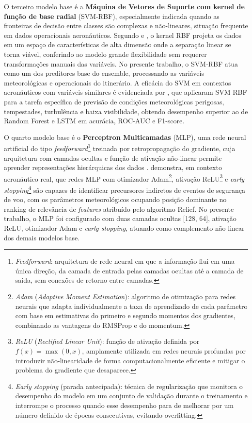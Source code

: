 \documentclass[english,brazilian]{UNISINOSartigo}
\begin{document}
O terceiro modelo base é a \textbf{Máquina de Vetores de Suporte com kernel de
função de base radial} (SVM-RBF), especialmente indicada quando as fronteiras de
decisão entre classes são complexas e não-lineares, situação frequente em dados
operacionais aeronáuticos. Segundo  e ,
o kernel RBF projeta os dados em um espaço de características de alta dimensão
onde a separação linear se torna viável, conferindo ao modelo grande flexibilidade
sem requerer transformações manuais das variáveis. No presente trabalho, o
SVM-RBF atua como um dos preditores base do ensemble, processando as variáveis
meteorológicas e operacionais do itinerário. A eficácia do SVM em contextos
aeronáuticos com variáveis similares é evidenciada por , que
aplicaram SVM-RBF para a tarefa específica de previsão de condições meteorológicas
perigosas, tempestades, turbulência e baixa visibilidade, obtendo desempenho
superior ao de Random Forest e LSTM em acurácia, ROC-AUC e F1-score.

O quarto modelo base é o \textbf{Perceptron Multicamadas} (MLP), uma rede neural
artificial do tipo \textit{feedforward}\footnote{\textit{Feedforward}:
arquitetura de rede neural em que a informação flui em uma única direção, da
camada de entrada pelas camadas ocultas até a camada de saída, sem conexões
de retorno entre camadas.} treinada por retropropagação do gradiente,
cuja arquitetura com camadas ocultas e função de ativação não-linear permite
aprender representações hierárquicas dos dados \cite{HASTIE2009,MITCHELL1997}.
 demonstra, em contexto aeronáutico real, que redes MLP
com otimizador Adam\footnote{\textit{Adam} (\textit{Adaptive Moment
Estimation}): algoritmo de otimização para redes neurais que adapta
individualmente a taxa de aprendizado de cada parâmetro com base em estimativas
do primeiro e segundo momentos dos gradientes, combinando as vantagens do
RMSProp e do momentum.}, ativação ReLU\footnote{\textit{ReLU}
(\textit{Rectified Linear Unit}): função de ativação definida por
$f(x) = \max(0, x)$, amplamente utilizada em redes neurais profundas por
introduzir não-linearidade de forma computacionalmente eficiente e mitigar o
problema do gradiente que desaparece.} e \textit{early stopping}\footnote{%
\textit{Early stopping} (parada antecipada): técnica de regularização que
monitora o desempenho do modelo em um conjunto de validação durante o
treinamento e interrompe o processo quando esse desempenho para de melhorar
por um número definido de épocas consecutivas, evitando overfitting.} são
capazes de
identificar precursores indiretos de eventos de segurança de voo, com os parâmetros
meteorológicos ocupando posição dominante no ranking de relevância de
\textit{features} atribuído pelo algoritmo Relief. No presente trabalho, o MLP foi configurado com duas camadas ocultas [128, 64],
ativação ReLU, otimizador Adam e \textit{early stopping}, atuando como complemento
não-linear dos demais modelos base.
\end{document}
